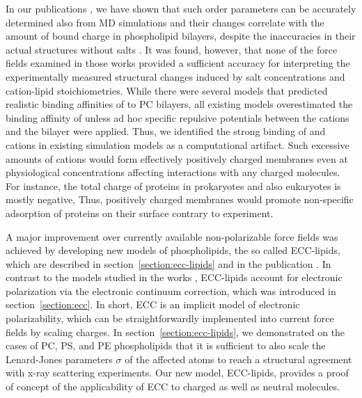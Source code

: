 In our publications \citep{catte16, nmrlipids_proj4},
we have shown that such order parameters can be accurately determined also from MD simulations
and their changes correlate with the amount of bound charge in phospholipid bilayers, 
despite the inaccuracies in their actual structures without salts \citep{botan15}. 
It was found, however, that
none of the force fields examined in those works 
provided a sufficient accuracy for interpreting 
the experimentally measured structural changes induced by salt concentrations
and cation-lipid stoichiometries. 
While there were several models
that predicted realistic binding affinities of  to PC bilayers,
all existing models overestimated the binding affinity of 
unless ad hoc specific repulsive potentials between the cations and the bilayer were applied. \citep{catte16, nmrlipids_proj4}
Thus,
we identified the strong binding of  and  cations
in existing simulation models as a computational artifact.  
Such excessive amounts of cations 
would form effectively positively charged membranes
even at physiological concentrations
affecting interactions with any charged molecules. 
For instance,
the total charge of proteins
in prokaryotes and also eukaryotes 
is mostly negative,
\citep{link1997identifying, link1997comparing, urquhart1998comparison, schwartz2001whole, knight2004global}
Thus,
positively charged membranes would promote non-specific adsorption of proteins on their surface 
contrary to experiment.  
\citep{junkova2016, lingwood2010lipid, sekerevs2015song} 


A major improvement over currently available non-polarizable force fields
was achieved by developing new models of phospholipids, 
the so called ECC-lipids,
which are described in section~\ref{section:ecc-lipids}
and in the publication \citep{melcr18}. 
In contrast to the models studied in the works \citep{catte16, nmrlipids_proj4},
ECC-lipids account for electronic polarization
via the electronic continuum correction,  
which was introduced in section~\ref{section:ecc}. 
In short, 
ECC is an implicit model of electronic polarizability,
which can be straightforwardly implemented into current force fields 
by scaling charges.  
In section~\ref{section:ecc-lipids},
we demonstrated on the cases of PC, PS, and PE phospholipids
that it is sufficient to also scale the Lenard-Jones parameters $\sigma$ of the affected atoms
to reach a structural agreement with x-ray scattering experiments. 
Our new model, ECC-lipids,
provides a proof of concept of the applicability of ECC
to charged as well as neutral molecules. 



